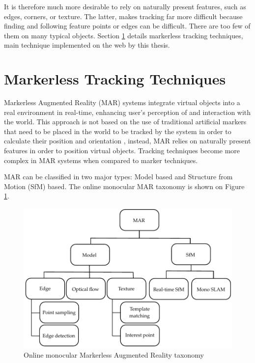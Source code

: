 It is therefore much more desirable to rely on naturally present features, such as edges, corners, or texture. The latter, makes tracking far more difficult because finding and following feature points or edges can be difficult. There are too few of them on many typical objects. Section \ref{sec:basic_concepts:markerless_tracking_technique} details markerless tracking techniques, main technique implemented on the web by this thesis.


\section{Markerless Tracking Techniques} %
\label{sec:basic_concepts:markerless_tracking_technique}

Markerless Augmented Reality (MAR) systems integrate virtual objects into a real environment in real-time, enhancing user's perception of and interaction with the world. This approach is not based on the use of traditional artificial markers that need to be placed in the world to be tracked by the system in order to calculate their position and orientation \cite{Teichrieb2007}, instead, MAR relies on naturally present features in order to position virtual objects. Tracking techniques become more complex in MAR systems when compared to marker techniques.

MAR can be classified in two major types: Model based and Structure from Motion (SfM) based. The online monocular MAR taxonomy is shown on Figure \ref{figure:mar_taxonomy}.

\begin{figure}[!htb]
  \centering
  \includegraphics{chapters/basic_concepts/mar_taxonomy.pdf}
  \caption{Online monocular Markerless Augmented Reality taxonomy}
  \label{figure:mar_taxonomy}
\end{figure}

